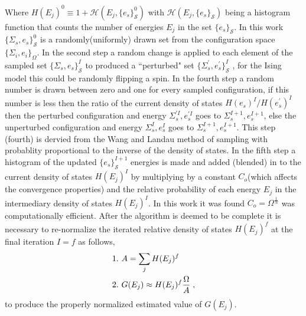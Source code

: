 \documentclass[aps,prl,reprint,superscriptaddress,showkeys]{revtex4-1}
\begin{document}
Where  $H(E_j)^0 \equiv 1 +  \mathcal{H}(E_j,\{e_s\}_{\mathcal{S}}^0)$ with $\mathcal{H}(E_j,\{e_s\}_{\mathcal{S}})$ being a histogram function that counts the number of energies $E_j$ in the set $\{e_s\}_{\mathcal{S}}$. In this work $\{\Sigma_{s},e_s\}_{\mathcal{S}}^0$  is a randomly(uniformly) drawn set from the configuration space $\{ \Sigma_i, e_i \}_\Omega $. In the second step  a random change is applied to each element of the sampled set $\{\Sigma_{s},e_s\}_{\mathcal{S}}^I$ to produced a ``perturbed" set $ \{\Sigma_{s}^{'},e_s^{'}\}_{\mathcal{S}}^I$ , for the Ising model this could be randomly flipping a spin.  In the fourth step a random number is drawn between zero and one for every sampled configuration, if this number is less then the ratio of the current density of states $H(e_s)^{I}/H(e_s^{'})^{I}$ then the perturbed configuration and energy  $\Sigma_{s}^{'I},e_s^{'I}$  goes to $\Sigma_{s}^{I+1},e_s^{I+1}$,  else the unperturbed configuration and energy $\Sigma_{s}^{I},e_s^I$  goes to $\Sigma_{s}^{I+1},e_s^{I+1}$. This step (fourth) is dervied from the Wang and Landau method of sampling with probablity proportional to the inverse of the density of states.  In the fifth step a histogram of the updated $\{ e_s \}^{I+1}_{\mathcal{S}}$ energies is made and added (blended) in to the current density of states $H(E_j)^I$   by multiplying  by a constant $C_{o}$(which affects the convergence properties) and the relative probability of each energy $E_j$ in the  intermediary density of states $H(E_j)^{I}$. In this work it was found  $C_{o}=\Omega^{\frac{1}{N}}$ was computationally efficient. After the algorithm is deemed to be complete it is necessary to re-normalize the iterated relative density of states $H(E_j)^f$ at the final iteration $I=f$ as follows, 
\begin{equation}
\begin{split}
&1. \hspace{0.125cm} A = \sum_jH(E_j)^f\\
&2. \hspace{0.125cm} G(E_j)\approx H(E_j)^f \frac{\Omega}{A} \;,
\end{split}
\end{equation}
to produce the properly normalized estimated value of $G(E_j)$. 
\end{document}
